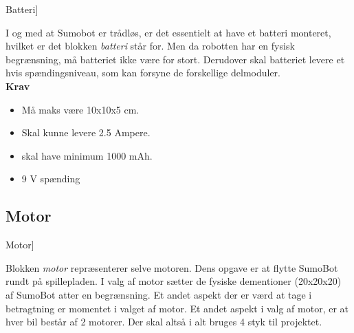 \begin{PartBlokDescription}{Batteri]}{}
\BlokSpacer{0.4cm}
\end{PartBlokDescription}

I og med at Sumobot er trådløs, er det essentielt at have et batteri monteret, hvilket er det blokken \textit{batteri} står for. Men da robotten har en fysisk begrænsning, må batteriet ikke være for stort. Derudover skal batteriet levere et hvis spændingsniveau, som kan forsyne de forskellige delmoduler.
\\
\textbf{Krav}
\begin{itemize}
\item Må maks være 10x10x5 cm. \tbr
\item Skal kunne levere 2.5 Ampere.
\item skal have minimum 1000 mAh. \tbr
\item 9 V spænding\tbr
\end{itemize}


\subsection{Motor}

\begin{PartBlokDescription}{Motor]}{}
\BlokSpacer{0cm}
\end{PartBlokDescription}

Blokken \textit{motor} repræsenterer selve motoren. Dens opgave er at flytte SumoBot rundt på spillepladen.
I valg af motor sætter de fysiske dementioner (20x20x20) af SumoBot atter en begrænsning. Et andet aspekt der er værd at tage i betragtning er momentet i valget af motor.
Et andet aspekt i valg af motor, er at hver bil består af 2 motorer. Der skal altså i alt bruges 4 styk til projektet. \tbr
\\


